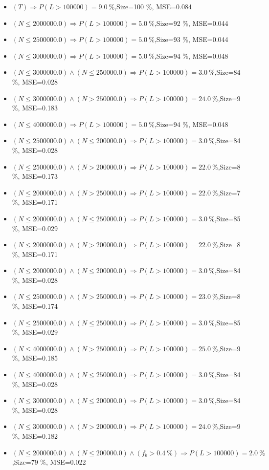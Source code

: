 \documentclass[numbered]{CSL}
\begin{document}
\begin{itemize}
\item $(T) \Rightarrow P(L > 100 000) = 9.0~\%$,\hfill Size=100 \%, MSE=0.084
\item $(N \leq 2000000.0) \Rightarrow P(L > 100 000) = 5.0~\%$,\hfill Size=92 \%, MSE=0.044
\item $(N \leq 2500000.0) \Rightarrow P(L > 100 000) = 5.0~\%$,\hfill Size=93 \%, MSE=0.044
\item $(N \leq 3000000.0) \Rightarrow P(L > 100 000) = 5.0~\%$,\hfill Size=94 \%, MSE=0.048
\item $(N \leq 3000000.0) \land (N \leq 250000.0) \Rightarrow P(L > 100 000) = 3.0~\%$,\hfill Size=84 \%, MSE=0.028
\item $(N \leq 3000000.0) \land (N > 250000.0) \Rightarrow P(L > 100 000) = 24.0~\%$,\hfill Size=9 \%, MSE=0.183
\item $(N \leq 4000000.0) \Rightarrow P(L > 100 000) = 5.0~\%$,\hfill Size=94 \%, MSE=0.048
\item $(N \leq 2500000.0) \land (N \leq 200000.0) \Rightarrow P(L > 100 000) = 3.0~\%$,\hfill Size=84 \%, MSE=0.028
\item $(N \leq 2500000.0) \land (N > 200000.0) \Rightarrow P(L > 100 000) = 22.0~\%$,\hfill Size=8 \%, MSE=0.173
\item $(N \leq 2000000.0) \land (N > 250000.0) \Rightarrow P(L > 100 000) = 22.0~\%$,\hfill Size=7 \%, MSE=0.171
\item $(N \leq 2000000.0) \land (N \leq 250000.0) \Rightarrow P(L > 100 000) = 3.0~\%$,\hfill Size=85 \%, MSE=0.029
\item $(N \leq 2000000.0) \land (N > 200000.0) \Rightarrow P(L > 100 000) = 22.0~\%$,\hfill Size=8 \%, MSE=0.171
\item $(N \leq 2000000.0) \land (N \leq 200000.0) \Rightarrow P(L > 100 000) = 3.0~\%$,\hfill Size=84 \%, MSE=0.028
\item $(N \leq 2500000.0) \land (N > 250000.0) \Rightarrow P(L > 100 000) = 23.0~\%$,\hfill Size=8 \%, MSE=0.174
\item $(N \leq 2500000.0) \land (N \leq 250000.0) \Rightarrow P(L > 100 000) = 3.0~\%$,\hfill Size=85 \%, MSE=0.029
\item $(N \leq 4000000.0) \land (N > 250000.0) \Rightarrow P(L > 100 000) = 25.0~\%$,\hfill Size=9 \%, MSE=0.185
\item $(N \leq 4000000.0) \land (N \leq 250000.0) \Rightarrow P(L > 100 000) = 3.0~\%$,\hfill Size=84 \%, MSE=0.028
\item $(N \leq 3000000.0) \land (N \leq 200000.0) \Rightarrow P(L > 100 000) = 3.0~\%$,\hfill Size=84 \%, MSE=0.028
\item $(N \leq 3000000.0) \land (N > 200000.0) \Rightarrow P(L > 100 000) = 24.0~\%$,\hfill Size=9 \%, MSE=0.182
\item $(N \leq 2000000.0) \land (N \leq 200000.0) \land (f_b > 0.4~\%) \Rightarrow P(L > 100 000) = 2.0~\%$,\hfill Size=79 \%, MSE=0.022
\end{itemize}
\end{document}
